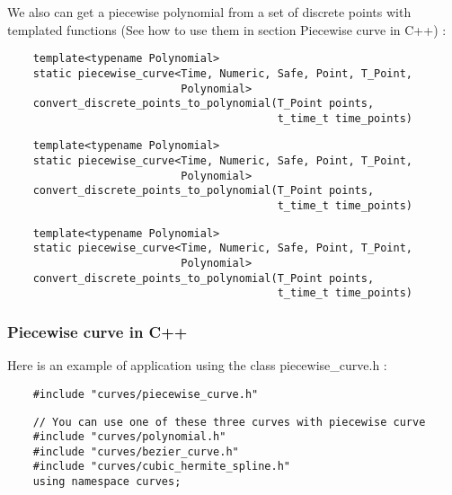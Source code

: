\documentclass{article}
\begin{document}
    We also can get a piecewise polynomial from a set of discrete points with templated functions (See how to use them in section Piecewise curve in C++) :
    \begin{lstlisting}
    template<typename Polynomial>
    static piecewise_curve<Time, Numeric, Safe, Point, T_Point,
                           Polynomial>
    convert_discrete_points_to_polynomial(T_Point points,
                                          t_time_t time_points)
    \end{lstlisting}
    \begin{lstlisting}
    template<typename Polynomial>
    static piecewise_curve<Time, Numeric, Safe, Point, T_Point,
                           Polynomial>
    convert_discrete_points_to_polynomial(T_Point points,
                                          t_time_t time_points)
    \end{lstlisting}
    \begin{lstlisting}
    template<typename Polynomial>
    static piecewise_curve<Time, Numeric, Safe, Point, T_Point,
                           Polynomial>
    convert_discrete_points_to_polynomial(T_Point points,
                                          t_time_t time_points)
    \end{lstlisting}

    \subsubsection{Piecewise curve in C++}
    Here is an example of application using the class piecewise\_curve.h :
    \begin{lstlisting}
    #include "curves/piecewise_curve.h"
    \end{lstlisting}
    \begin{lstlisting}
    // You can use one of these three curves with piecewise curve
    #include "curves/polynomial.h"
    #include "curves/bezier_curve.h"
    #include "curves/cubic_hermite_spline.h"
    using namespace curves;
    \end{lstlisting}
\end{document}

